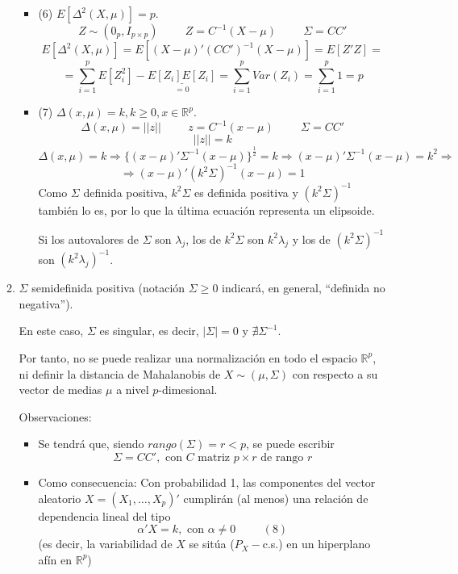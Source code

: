 \documentclass[11pt,a4paper]{article}
\begin{document}
\begin{itemize}
\begin{enumerate}[label=(\Alph*)]
\begin{itemize}
\item (6) $E[\Delta^{2}(X, \mu)] = p$.
$$Z \sim (0_{p}, I_{p \times p}) \hspace{1cm} Z = C^{-1}(X - \mu) \hspace{1cm} \Sigma = CC'$$
$$E[\Delta^{2}(X, \mu)] = E[(X - \mu)'(CC')^{-1}(X - \mu)] = E[Z'Z] =$$
$$= \sum_{i=1}^{p} E[Z_{i}^{2}] - \underset{= 0}{\underline{E[Z_{i}]E[Z_{i}]}} = \sum_{i=1}^{p} Var(Z_{i}) = \sum_{i=1}^{p} 1 = p$$

\item (7) $\Delta(x, \mu) = k, k \geq 0, x \in \mathbb{R}^{p}$.
$$\Delta(x, \mu) = ||z|| \hspace{1cm} z = C^{-1}(x - \mu) \hspace{1cm} \Sigma = CC'$$
$$||z|| = k$$
$$\Delta(x, \mu) = k \Rightarrow \{(x-\mu)' \Sigma^{-1} (x - \mu)\}^{\frac{1}{2}} = k \Rightarrow (x - \mu)' \Sigma^{-1} (x - \mu) = k^{2} \Rightarrow$$
$$\Rightarrow (x - \mu)' (k^{2}\Sigma)^{-1} (x - \mu) = 1$$
Como $\Sigma$ definida positiva, $k^{2} \Sigma$ es definida positiva y $(k^{2} \Sigma)^{-1}$ también lo es, por lo que la última ecuación representa un elipsoide.

Si los autovalores de $\Sigma$ son $\lambda_{j}$, los de $k^{2}\Sigma$ son $k^{2}\lambda_{j}$ y los de $(k^{2}\Sigma)^{-1}$ son $(k^{2}\lambda_{j})^{-1}$.
\end{itemize}

\item $\Sigma$ semidefinida positiva (notación $\Sigma \geq 0$ indicará, en general, ``definida no negativa'').

En este caso, $\Sigma$ es singular, es decir, $|\Sigma| = 0$ y $\nexists \Sigma^{-1}$.

Por tanto, no se puede realizar una normalización en todo el espacio $\mathbb{R}^{p}$, ni definir la distancia de Mahalanobis de $X \sim (\mu, \Sigma)$ con respecto a su vector de medias $\mu$ a nivel $p$-dimesional.

Observaciones:
\begin{itemize}
\item Se tendrá que, siendo $rango(\Sigma) = r < p$, se puede escribir
$$\Sigma = CC', \text{ con } C \text{ matriz } p \times r \text{ de rango } r$$

\item Como consecuencia: Con probabilidad 1, las componentes del vector aleatorio $X = (X_{1}, \dots, X_{p})'$ cumplirán (al menos) una relación de dependencia lineal del tipo
$$\alpha'X = k, \text{ con } \alpha \neq 0 \hspace{1cm} (8)$$
(es decir, la variabilidad de $X$ se sitúa ($P_{X}-$c.s.) en un hiperplano afín en $\mathbb{R}^{p}$)


\end{itemize}
\end{enumerate}
\end{itemize}
\end{document}
